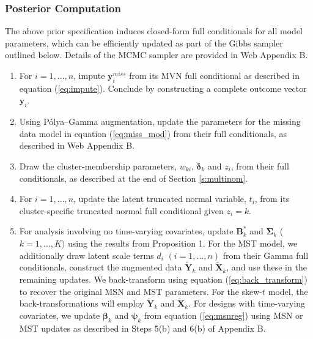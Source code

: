 \documentclass[useAMS,usenatbib,referee]{biom}
\begin{document}
\subsubsection{Posterior Computation}
\label{s:postcomp}
The above prior specification induces closed-form full conditionals for all model parameters, which can be efficiently updated as part of the Gibbs sampler outlined below.
Details of the MCMC sampler are provided in Web Appendix B.
\begin{enumerate}
\item For $i=1,\ldots,n$, impute $\mathbf{y}_i^{miss}$ from its MVN full conditional as described in equation (\ref{eq:impute}). Conclude by constructing a complete outcome vector $\mathbf{y}_i$.
\item Using P\'{o}lya--Gamma augmentation, update the parameters for the missing data model in equation (\ref{eq:miss_mod}) from their full conditionals, as described in Web Appendix B.
\item Draw the cluster-membership parameters, $w_{ki}$, $\boldsymbol\delta_k$ and $z_i$, from their full conditionals, as described at the end of Section \ref{s:multinom}.
\item For $i=1,\ldots,n$, update the latent truncated normal variable, $t_i$, from its cluster-specific truncated normal full conditional given $z_i=k$.
\item For analysis involving no time-varying covariates, update $\mathbf{B}^*_k$ and $\boldsymbol\Sigma_k$ ($k=1,\ldots,K)$ using the results from Proposition 1. For the MST model, we additionally draw latent scale terms $d_i$ $(i=1,\ldots,n)$ from their Gamma full conditionals, construct the augmented data $\tilde{\mathbf{Y}}_k$ and $\tilde{\mathbf{X}}_k$, and use these in the remaining updates. We back-transform using equation (\ref{eq:back_transform}) to recover the original MSN and MST parameters. For the skew-$t$ model, the back-transformations will employ $\tilde{\mathbf{Y}}_k$ and $\tilde{\mathbf{X}}_k$. For designs with time-varying covariates, we update $\boldsymbol\beta_k$ and $\boldsymbol\psi_k$ from equation (\ref{eq:msnreg}) using MSN or MST updates as described in Steps 5(b) and 6(b) of Appendix B.
\end{enumerate}
\end{document}
